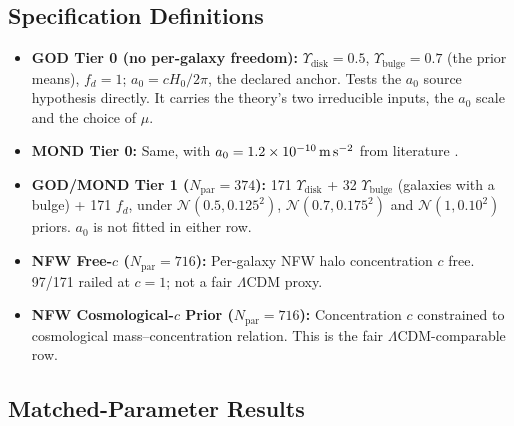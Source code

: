 \documentclass[aps,prd,preprint,superscriptaddress,nofootinbib,amsmath,amssymb,floatfix]{revtex4-2}
\makeatletter
\DeclareRobustCommand{\_}{%
    \ifmmode\nfss@text{\textunderscore}\else\textunderscore\penalty\z@\fi}%
\makeatother
\begin{document}
\subsection{Specification Definitions}

\begin{itemize}
    \item \textbf{GOD Tier 0 (no per-galaxy freedom):} $\Upsilon_{\text{disk}} = 0.5$, $\Upsilon_{\text{bulge}} = 0.7$ (the prior means), $f_d = 1$; $a_0 = cH_0/2\pi$, the declared anchor. Tests the $a_0$ source hypothesis directly. It carries the theory's two irreducible inputs, the $a_0$ scale and the choice of $\mu$.
    \item \textbf{MOND Tier 0:} Same, with $a_0 = 1.2 \times 10^{-10}\,\text{m\,s}^{-2}$ from literature \cite{McGaugh2016}.
    \item \textbf{GOD/MOND Tier 1 ($N_{\text{par}} = 374$):} 171 $\Upsilon_{\text{disk}}$ + 32 $\Upsilon_{\text{bulge}}$ (galaxies with a bulge) + 171 $f_d$, under $\mathcal{N}(0.5, 0.125^2)$, $\mathcal{N}(0.7, 0.175^2)$ and $\mathcal{N}(1, 0.10^2)$ priors. $a_0$ is not fitted in either row.
    \item \textbf{NFW Free-$c$ ($N_{\text{par}} = 716$):} Per-galaxy NFW halo concentration $c$ free. 97/171 railed at $c=1$; not a fair $\Lambda$CDM proxy.
    \item \textbf{NFW Cosmological-$c$ Prior ($N_{\text{par}} = 716$):} Concentration $c$ constrained to cosmological mass--concentration relation. This is the fair $\Lambda$CDM-comparable row.
\end{itemize}

\subsection{Matched-Parameter Results}
\end{document}
